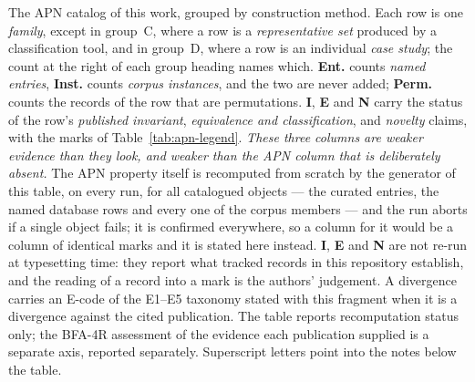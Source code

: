 \providecommand{\tnote}[1]{\textsuperscript{\itshape #1}}
\newenvironment{apncatnotes}%
  {\par\vspace{3pt}\scriptsize\raggedright
   \begin{list}{}{%
     \setlength{\leftmargin}{1.5em}\setlength{\labelwidth}{1.1em}%
     \setlength{\labelsep}{0.4em}\setlength{\itemsep}{1pt}%
     \setlength{\parsep}{0pt}\setlength{\topsep}{0pt}%
     \renewcommand{\makelabel}[1]{\itshape ##1\hfil}}}%
  {\end{list}\par}


\begin{table}[tp]
  \centering
  \scriptsize
  \setlength{\tabcolsep}{3.2pt}
  \caption{The APN catalog of this work, grouped by construction method.  Each
    row is one \emph{family}, except in group~C, where a row is a
    \emph{representative set} produced by a classification tool, and in
    group~D, where a row is an individual \emph{case study}; the count at the
    right of each group heading names which.  \textbf{Ent.} counts \emph{named
    entries}, \textbf{Inst.} counts \emph{corpus instances}, and the two are
    never added; \textbf{Perm.} counts the records of the row that are
    permutations.  \textbf{I}, \textbf{E} and \textbf{N} carry the status of
    the row's \emph{published invariant}, \emph{equivalence and
    classification}, and \emph{novelty} claims, with the marks of
    Table~\ref{tab:apn-legend}.
    \emph{These three columns are weaker evidence than they look, and weaker
    than the APN column that is deliberately absent.}  The APN property itself
    is recomputed from scratch by the generator of this table, on every run,
    for all \apnReverified{} catalogued objects --- the \apnCurated{} curated
    entries, the \apnDbApnRows{} named database rows and every one of the
    \apnInstances{} corpus members --- and the run aborts if a single object
    fails; it is confirmed everywhere, so a column for it would be a column of
    identical marks and it is stated here instead.  \textbf{I}, \textbf{E} and
    \textbf{N} are not re-run at typesetting time: they report what tracked
    records in this repository establish, and the reading of a record into a
    mark is the authors' judgement.  A divergence carries an E-code of the
    E1--E5 taxonomy stated with this fragment when it is a divergence against
    the cited publication.  The table reports recomputation status only; the BFA-4R
    assessment of the evidence each publication supplied is a separate axis,
    reported separately.  Superscript letters point into the notes below the
    table.}
  \label{tab:apn-catalog}
  
\end{table}

